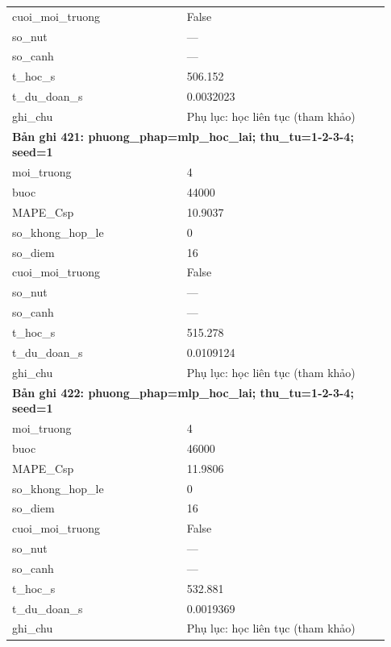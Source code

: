 \begin{longtable}{p{0.43\linewidth}p{0.50\linewidth}}
cuoi\_\allowbreak moi\_\allowbreak truong & False \\
so\_\allowbreak nut & — \\
so\_\allowbreak canh & — \\
t\_\allowbreak hoc\_\allowbreak s & 506.152 \\
t\_\allowbreak du\_\allowbreak doan\_\allowbreak s & 0.0032023 \\
ghi\_\allowbreak chu & Phụ lục: học liên tục (tham khảo) \\
\midrule
\multicolumn{2}{p{0.95\linewidth}}{\textbf{Bản ghi 421: phuong\_phap=mlp\_hoc\_lai; thu\_tu=1-2-3-4; seed=1}} \\
moi\_\allowbreak truong & 4 \\
buoc & 44000 \\
MAPE\_\allowbreak Csp & 10.9037 \\
so\_\allowbreak khong\_\allowbreak hop\_\allowbreak le & 0 \\
so\_\allowbreak diem & 16 \\
cuoi\_\allowbreak moi\_\allowbreak truong & False \\
so\_\allowbreak nut & — \\
so\_\allowbreak canh & — \\
t\_\allowbreak hoc\_\allowbreak s & 515.278 \\
t\_\allowbreak du\_\allowbreak doan\_\allowbreak s & 0.0109124 \\
ghi\_\allowbreak chu & Phụ lục: học liên tục (tham khảo) \\
\midrule
\multicolumn{2}{p{0.95\linewidth}}{\textbf{Bản ghi 422: phuong\_phap=mlp\_hoc\_lai; thu\_tu=1-2-3-4; seed=1}} \\
moi\_\allowbreak truong & 4 \\
buoc & 46000 \\
MAPE\_\allowbreak Csp & 11.9806 \\
so\_\allowbreak khong\_\allowbreak hop\_\allowbreak le & 0 \\
so\_\allowbreak diem & 16 \\
cuoi\_\allowbreak moi\_\allowbreak truong & False \\
so\_\allowbreak nut & — \\
so\_\allowbreak canh & — \\
t\_\allowbreak hoc\_\allowbreak s & 532.881 \\
t\_\allowbreak du\_\allowbreak doan\_\allowbreak s & 0.0019369 \\
ghi\_\allowbreak chu & Phụ lục: học liên tục (tham khảo) \\

\end{longtable}
